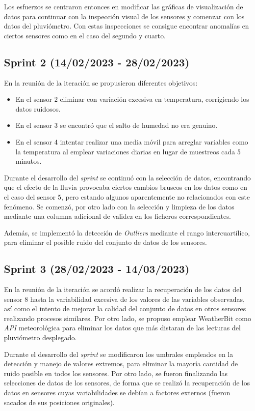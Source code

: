 Los esfuerzos se centraron entonces en modificar las gráficas de visualización de datos para continuar con la inspección visual de los sensores 
y comenzar con los datos del pluviómetro.
Con estas inspecciones se consigue encontrar anomalías en ciertos sensores como en el caso del segundo y cuarto.

\subsection{Sprint 2 (14/02/2023 - 28/02/2023)}
En la reunión de la iteración se propusieron diferentes objetivos:
\begin{itemize}
    \item En el sensor 2 eliminar con variación excesiva en temperatura, corrigiendo los datos ruidosos.
    \item En el sensor 3 se encontró que el salto de humedad no era genuino.
    \item En el sensor 4 intentar realizar una media móvil para arreglar variables como la temperatura al emplear variaciones diarias en lugar de 
        muestreos cada 5 minutos.
\end{itemize}

Durante el desarrollo del \textit{sprint} se continuó con la selección de datos, encontrando que el efecto de la lluvia provocaba ciertos cambios 
bruscos en los datos como en el caso del sensor 5, pero estando algunos aparentemente no relacionados con este fenómeno.
Se comenzó, por otro lado con la selección y limpieza de los datos mediante una columna adicional de validez en los ficheros correspondientes.

Además, se implementó la detección de \textit{Outliers} mediante el rango intercuartílico, para eliminar el posible ruido del conjunto de datos
de los sensores.

\subsection{Sprint 3 (28/02/2023 - 14/03/2023)}
En la reunión de la iteración se acordó realizar la recuperación de los datos del sensor 8 hasta la variabilidad excesiva de los valores de las
variables observadas, así como el intento de mejorar la calidad del conjunto de datos en otros sensores realizando procesos similares.
Por otro lado, se propuso emplear WeatherBit como \textit{API} meteorológica para eliminar los datos que más distaran de las lecturas del 
pluviómetro desplegado.

Durante el desarrollo del \textit{sprint} se modificaron los umbrales empleados en la detección y manejo de valores extremos, para eliminar la mayoría
cantidad de ruido posible en todos los sensores.
Por otro lado, se fueron finalizando las selecciones de datos de los sensores, de forma que se realizó la recuperación de los datos en sensores cuyas 
variabilidades se debían a factores externos (fueron sacados de sus posiciones originales).

